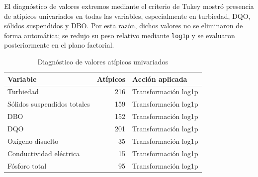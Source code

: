 \documentclass[12pt,letterpaper]{article}
\begin{document}
\begin{table}[H]
\centering
\caption{Estadísticas descriptivas}
\end{table}

El diagnóstico de valores extremos mediante el criterio de Tukey mostró presencia de atípicos univariados en todas las variables, especialmente en turbiedad, DQO, sólidos suspendidos y DBO. Por esta razón, dichos valores no se eliminaron de forma automática; se redujo su peso relativo mediante \texttt{log1p} y se evaluaron posteriormente en el plano factorial.

\begin{table}[H]
\centering
\caption{Diagnóstico de valores atípicos univariados}
\begin{tabular}{lrl}
\toprule
\textbf{Variable} & \textbf{Atípicos} & \textbf{Acción aplicada} \\
\midrule
Turbiedad & 216 & Transformación log1p \\
Sólidos suspendidos totales & 159 & Transformación log1p \\
DBO & 152 & Transformación log1p \\
DQO & 201 & Transformación log1p \\
Oxígeno disuelto & 35 & Transformación log1p \\
Conductividad eléctrica & 15 & Transformación log1p \\
Fósforo total & 95 & Transformación log1p \\
\bottomrule
\end{tabular}
\end{table}
\end{document}
